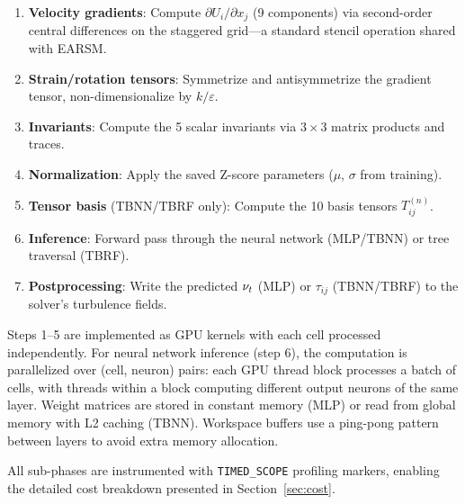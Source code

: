 \begin{enumerate}
    \item \textbf{Velocity gradients}: Compute $\partial U_i / \partial x_j$ (9 components) via second-order central differences on the staggered grid---a standard stencil operation shared with EARSM.
    \item \textbf{Strain/rotation tensors}: Symmetrize and antisymmetrize the gradient tensor, non-dimensionalize by $k/\varepsilon$.
    \item \textbf{Invariants}: Compute the 5 scalar invariants via $3 \times 3$ matrix products and traces.
    \item \textbf{Normalization}: Apply the saved Z-score parameters ($\mu$, $\sigma$ from training).
    \item \textbf{Tensor basis} (TBNN/TBRF only): Compute the 10 basis tensors $T^{(n)}_{ij}$.
    \item \textbf{Inference}: Forward pass through the neural network (MLP/TBNN) or tree traversal (TBRF).
    \item \textbf{Postprocessing}: Write the predicted $\nu_t$ (MLP) or $\tau_{ij}$ (TBNN/TBRF) to the solver's turbulence fields.
\end{enumerate}

Steps 1--5 are implemented as GPU kernels with each cell processed independently.
For neural network inference (step 6), the computation is parallelized over (cell, neuron) pairs: each GPU thread block processes a batch of cells, with threads within a block computing different output neurons of the same layer.
Weight matrices are stored in constant memory (MLP) or read from global memory with L2 caching (TBNN).
Workspace buffers use a ping-pong pattern between layers to avoid extra memory allocation.

All sub-phases are instrumented with \texttt{TIMED\_SCOPE} profiling markers, enabling the detailed cost breakdown presented in Section~\ref{sec:cost}.
